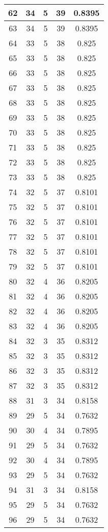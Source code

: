 \documentclass[letterpaper, 12pt]{article}
\begin{document}
\begin{longtable}{|c|c|c|c|c|}
\hline
62 & 34 & 5 & 39 & 0.8395 \\
\hline
63 & 34 & 5 & 39 & 0.8395 \\
\hline
64 & 33 & 5 & 38 & 0.825 \\
\hline
65 & 33 & 5 & 38 & 0.825 \\
\hline
66 & 33 & 5 & 38 & 0.825 \\
\hline
67 & 33 & 5 & 38 & 0.825 \\
\hline
68 & 33 & 5 & 38 & 0.825 \\
\hline
69 & 33 & 5 & 38 & 0.825 \\
\hline
70 & 33 & 5 & 38 & 0.825 \\
\hline
71 & 33 & 5 & 38 & 0.825 \\
\hline
72 & 33 & 5 & 38 & 0.825 \\
\hline
73 & 33 & 5 & 38 & 0.825 \\
\hline
74 & 32 & 5 & 37 & 0.8101 \\
\hline
75 & 32 & 5 & 37 & 0.8101 \\
\hline
76 & 32 & 5 & 37 & 0.8101 \\
\hline
77 & 32 & 5 & 37 & 0.8101 \\
\hline
78 & 32 & 5 & 37 & 0.8101 \\
\hline
79 & 32 & 5 & 37 & 0.8101 \\
\hline
80 & 32 & 4 & 36 & 0.8205 \\
\hline
81 & 32 & 4 & 36 & 0.8205 \\
\hline
82 & 32 & 4 & 36 & 0.8205 \\
\hline
83 & 32 & 4 & 36 & 0.8205 \\
\hline
84 & 32 & 3 & 35 & 0.8312 \\
\hline
85 & 32 & 3 & 35 & 0.8312 \\
\hline
86 & 32 & 3 & 35 & 0.8312 \\
\hline
87 & 32 & 3 & 35 & 0.8312 \\
\hline
88 & 31 & 3 & 34 & 0.8158 \\
\hline
89 & 29 & 5 & 34 & 0.7632 \\
\hline
90 & 30 & 4 & 34 & 0.7895 \\
\hline
91 & 29 & 5 & 34 & 0.7632 \\
\hline
92 & 30 & 4 & 34 & 0.7895 \\
\hline
93 & 29 & 5 & 34 & 0.7632 \\
\hline
94 & 31 & 3 & 34 & 0.8158 \\
\hline
95 & 29 & 5 & 34 & 0.7632 \\
\hline
96 & 29 & 5 & 34 & 0.7632 \\

\end{longtable}
\end{document}
